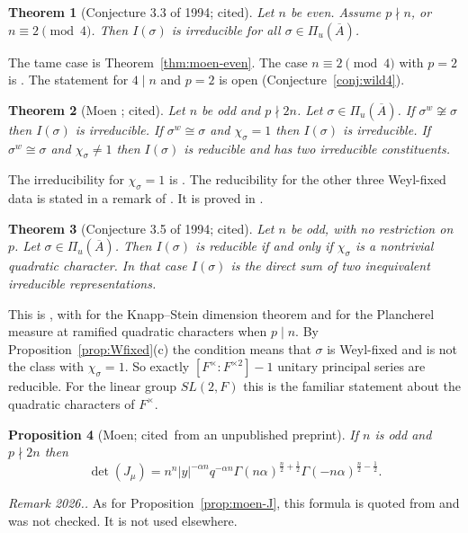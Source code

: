 \documentclass[12pt,letterpaper]{article}
\numberwithin{equation}{section}
\newtheorem{theorem}{Theorem}[section]
\newtheorem{proposition}[theorem]{Proposition}
\theoremstyle{definition}
\newcounter{rmk}
\newcommand{\unverified}[1]{\refstepcounter{rmk}\par\smallskip\noindent\textit{Remark 2026.\arabic{rmk}.} #1\par\smallskip}
\newcommand{\cited}{cited}
\newcommand{\bA}{\overline{A}}
\begin{document}
\begin{theorem}[Conjecture 3.3 of 1994; \cited]\label{thm:n-even}
Let $n$ be even.  Assume $p\nmid n$, or $n\equiv2\pmod4$.  Then $I(\sigma)$ is irreducible
for all $\sigma\in\Pi_u(\bA)$.
\end{theorem}
The tame case is Theorem~\ref{thm:moen-even}.  The case $n\equiv2\pmod4$ with $p=2$ is
\cite[Proposition~5.5]{Sz19}.  The statement for $4\mid n$ and $p=2$ is open
(Conjecture~\ref{conj:wild4}).

\begin{theorem}[Moen \cite{Mo88}; \cited]\label{thm:moen-odd}
Let $n$ be odd and $p\nmid 2n$.  Let $\sigma\in\Pi_u(\bA)$.  If $\sigma^w\not\cong\sigma$
then $I(\sigma)$ is irreducible.  If $\sigma^w\cong\sigma$ and $\chi_\sigma=1$ then
$I(\sigma)$ is irreducible.  If $\sigma^w\cong\sigma$ and $\chi_\sigma\ne1$ then
$I(\sigma)$ is reducible and has two irreducible constituents.
\end{theorem}
The irreducibility for $\chi_\sigma=1$ is \cite[Theorem~1(a)]{Mo88}.  The reducibility for
the other three Weyl-fixed data is stated in a remark of \cite{Mo88}.  It is proved in
\cite[Theorem~5.2]{GS16}.

\begin{theorem}[Conjecture 3.5 of 1994; \cited]\label{thm:n-odd-conj}
Let $n$ be odd, with no restriction on $p$.  Let $\sigma\in\Pi_u(\bA)$.  Then $I(\sigma)$ is
reducible if and only if $\chi_\sigma$ is a nontrivial quadratic character.  In that case
$I(\sigma)$ is the direct sum of two inequivalent irreducible representations.
\end{theorem}
This is \cite[Proposition~5.5]{Sz19}, with \cite{Lu20} for the Knapp--Stein dimension
theorem and \cite[Proposition~1]{Sz24} for the Plancherel measure at ramified quadratic
characters when $p\mid n$.  By Proposition~\ref{prop:Wfixed}(c) the condition means that
$\sigma$ is Weyl-fixed and is not the class with $\chi_\sigma=1$.  So exactly
$[F^\times:F^{\times2}]-1$ unitary principal series are reducible.  For the linear group
$SL(2,F)$ this is the familiar statement about the quadratic characters of $F^\times$.

\begin{proposition}[Moen; \cited\ from an unpublished preprint]\label{prop:moen-det}
If $n$ is odd and $p\nmid2n$ then
\[
\det(J_\mu)=n^n|y|^{-\alpha n}q^{-\alpha n}\Gamma(n\alpha)^{\frac n2+\frac12}\Gamma(-n\alpha)^{\frac n2-\frac12}.
\]
\end{proposition}
\unverified{As for Proposition~\ref{prop:moen-J}, this formula is quoted from \cite{MoND}
and was not checked.  It is not used elsewhere.}
\end{document}
